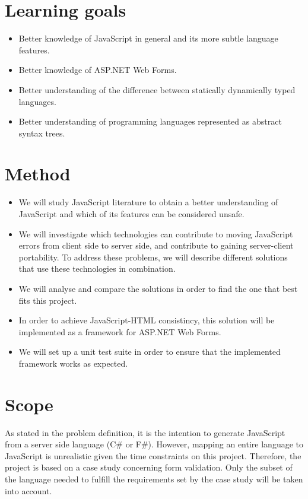 	\section{Learning goals}
		\begin{itemize}
			\item Better knowledge of JavaScript in general and its more subtle language features.
			\item Better knowledge of ASP.NET Web Forms.
		 	\item Better understanding of the difference between statically dynamically typed languages.
			\item Better understanding of programming languages represented as abstract syntax trees.
		\end{itemize}

\section{Method}
	\begin{itemize}
	\item We will study JavaScript literature to obtain a better understanding of JavaScript and which of its features can be considered unsafe. 
	\item We will investigate which technologies can contribute to moving JavaScript errors from client side to server side, and contribute to gaining server-client portability. To address these problems, we will describe different solutions that use these technologies in combination.
	\item We will analyse and compare the solutions in order to find the one that best fits this project. 
	\item In order to achieve JavaScript-HTML consistincy, this solution will be implemented as a framework for ASP.NET Web Forms.
	\item We will set up a unit test suite in order to ensure that the implemented framework works as expected.
	\end{itemize}

\section{Scope}
	As stated in the problem definition, it is the intention to generate JavaScript from a server side language (C\# or F\#). However, mapping an entire language to JavaScript is unrealistic given the time constraints on this project. Therefore, the project is based on a case study concerning form validation. Only the subset of the language needed to fulfill the requirements set by the case study will be taken into account.

